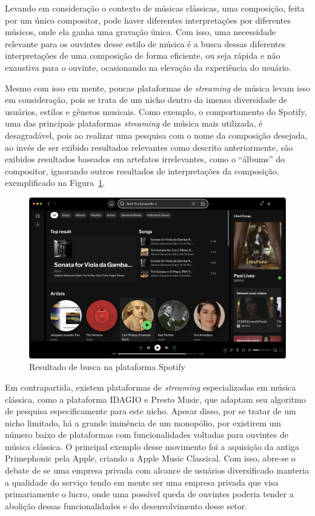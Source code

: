 \documentclass[12pt]{article}
\begin{document}
Levando em consideração o contexto de músicas clássicas, uma composição, feita
por um único compositor, pode haver diferentes interpretações por diferentes
músicos, onde ela ganha uma gravação única. Com isso, uma necessidade relevante
para os ouvintes desse estilo de  música é a busca dessas diferentes
interpretações de uma composição de forma eficiente, ou seja rápida e não
exaustiva para o ouvinte, ocasionando na elevação da experiência do usuário.

Mesmo com isso em mente, poucas plataformas de \emph{streaming} de música levam
isso em consideração, pois se trata de um nicho dentro da imensa diversidade de
usuários, estilos e gêneros musicais. Como exemplo, o comportamento do Spotify,
uma das principais plataformas \emph{streaming} de música mais utilizada, é
desagradável, pois ao realizar uma pesquisa com o nome da composição desejada,
ao invés de ser exibido resultados relevantes como descrito anteriormente, são
exibidos resultados baseados em artefatos irrelevantes, como o “álbums” do
compositor, ignorando outros resultados de interpretações da composição,
exemplificado na Figura~\ref{fig:spotify}.

\begin{figure}[ht]
\centering
\includegraphics[width=1\textwidth]{figuras/Spotify.png}
\caption{Resultado de busca na plataforma Spotify}
\label{fig:spotify}
\end{figure}

Em contrapartida, existem plataformas de \emph{streaming} especializadas em
música clássica, como a plataforma IDAGIO e Presto Music, que adaptam seu
algoritmo de pesquisa especificamente para este nicho. Apesar disso, por se
tratar de um nicho limitado, há a grande iminência de um monopólio, por
existirem um número baixo de plataformas com funcionalidades voltadas para
ouvintes de música clássica. O principal exemplo desse movimento foi a aquisição
da antiga Primephonic pela Apple, criando a Apple Music Classical. Com isso,
abre-se o debate de se uma empresa privada com alcance de usuários diversificado
manteria a qualidade do serviço tendo em mente ser uma empresa privada que visa
primariamente o lucro, onde uma possível queda de ouvintes poderia tender a
abolição dessas funcionalidades e do desenvolvimento desse setor.
\end{document}
